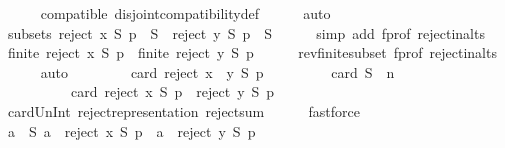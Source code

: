 \begin{isabellebody}
\ \ \ \ \isamarkupfalse%
\ compatible\ disjoint{\isacharunderscore}{\kern0pt}compatibility{\isacharunderscore}{\kern0pt}def\isanewline
\ \ \ \ \isamarkupfalse%
\ auto\isanewline
\ \ \isamarkupfalse%
\ subsets{\isacharcolon}{\kern0pt}\ {\isachardoublequoteopen}{\isacharparenleft}{\kern0pt}reject\ x\ S\ p{\isacharparenright}{\kern0pt}\ {\isasymsubseteq}\ S\ {\isasymand}\ {\isacharparenleft}{\kern0pt}reject\ y\ S\ p{\isacharparenright}{\kern0pt}\ {\isasymsubseteq}\ S{\isachardoublequoteclose}\isanewline
\ \ \ \ \isamarkupfalse%
\ {\isacharparenleft}{\kern0pt}simp\ add{\isacharcolon}{\kern0pt}\ f{\isacharunderscore}{\kern0pt}prof\ reject{\isacharunderscore}{\kern0pt}in{\isacharunderscore}{\kern0pt}alts{\isacharparenright}{\kern0pt}\isanewline
\ \ \isamarkupfalse%
\ {\isachardoublequoteopen}finite\ {\isacharparenleft}{\kern0pt}reject\ x\ S\ p{\isacharparenright}{\kern0pt}\ {\isasymand}\ finite\ {\isacharparenleft}{\kern0pt}reject\ y\ S\ p{\isacharparenright}{\kern0pt}{\isachardoublequoteclose}\isanewline
\ \ \ \ \isamarkupfalse%
\ rev{\isacharunderscore}{\kern0pt}finite{\isacharunderscore}{\kern0pt}subset\ f{\isacharunderscore}{\kern0pt}prof\ reject{\isacharunderscore}{\kern0pt}in{\isacharunderscore}{\kern0pt}alts\isanewline
\ \ \ \ \isamarkupfalse%
\ auto\isanewline
\ \ \isamarkupfalse%
\ {}{\isacharcolon}{\kern0pt}\isanewline
\ \ \ \ {\isachardoublequoteopen}card\ {\isacharparenleft}{\kern0pt}reject\ {\isacharparenleft}{\kern0pt}x\ {\isasymparallel}\isactrlsub {\isasymup}\ y{\isacharparenright}{\kern0pt}\ S\ p{\isacharparenright}{\kern0pt}\ {\isacharequal}{\kern0pt}\isanewline
\ \ \ \ \ \ \ \ card\ S\ {\isacharplus}{\kern0pt}\ n\ {\isacharminus}{\kern0pt}\isanewline
\ \ \ \ \ \ \ \ \ \ card\ {\isacharparenleft}{\kern0pt}{\isacharparenleft}{\kern0pt}reject\ x\ S\ p{\isacharparenright}{\kern0pt}\ {\isasymunion}\ {\isacharparenleft}{\kern0pt}reject\ y\ S\ p{\isacharparenright}{\kern0pt}{\isacharparenright}{\kern0pt}{\isachardoublequoteclose}\isanewline
\ \ \ \ \isamarkupfalse%
\ card{\isacharunderscore}{\kern0pt}Un{\isacharunderscore}{\kern0pt}Int\ reject{\isacharunderscore}{\kern0pt}representation\ reject{\isacharunderscore}{\kern0pt}sum\isanewline
\ \ \ \ \isamarkupfalse%
\ fastforce\isanewline
\ \ \isamarkupfalse%
\ {\isachardoublequoteopen}{\isasymforall}a\ {\isasymin}\ S{\isachardot}{\kern0pt}\ a\ {\isasymin}\ {\isacharparenleft}{\kern0pt}reject\ x\ S\ p{\isacharparenright}{\kern0pt}\ {\isasymor}\ a\ {\isasymin}\ {\isacharparenleft}{\kern0pt}reject\ y\ S\ p{\isacharparenright}{\kern0pt}{\isachardoublequoteclose}\isanewline

\end{isabellebody}
